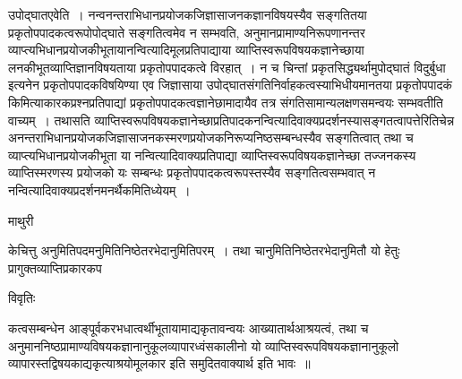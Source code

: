 \documentclass[10pt, openany]{book}
\begin{document}
{{\la उपोद्घातएवेति~।} नन्वनन्तराभिधानप्रयोजकजिज्ञासाजनकज्ञानविषयस्यैव सङ्गतितया प्रकृतोपपादकत्वरूपोपोद्घाते सङ्गतित्वमेव न सम्भवति,
अनुमानप्रामाण्यनिरूपणानन्तर व्याप्त्यभिधानप्रयोजकीभूतायानन्वित्यादिमूलप्रतिपाद्याया व्याप्तिस्वरूपविषयकज्ञानेच्छाया लनकीभूतव्याप्तिज्ञानविषयताया प्रकृतोपपादकत्वे विरहात्~। न च चिन्तां प्रकृतसिद्ध्यर्थामुपोद्घातं विदुर्बुधा इत्यनेन प्रकृतोपपादकविषयिण्या एव जिज्ञासाया उपोद्घातसंगतिनिर्वाहकत्वस्याभिधीयमानतया प्रकृतोपपादकं किमित्याकारकप्रश्नप्रतिपाद्यां प्रकृतोपपादकत्वज्ञानेछामादायैव तत्र संगतिसामान्यलक्षणसमन्वयः सम्भवतीति वाच्यम्~। तथासति व्याप्तिस्वरूपविषयकज्ञानेच्छाप्रतिपादकनन्वित्यादिवाक्यप्रदर्शनस्यासङ्गतत्वापत्तेरितिचेन्न अनन्तराभिधानप्रयोजकजिज्ञासाजनकस्मरणप्रयोजकनिरूप्यनिष्ठसम्बन्धस्यैव सङ्गतित्वात् तथा च व्याप्त्यभिधानप्रयोजकीभूता या नन्वित्यादिवाक्यप्रतिपाद्या व्याप्तिस्वरूपविषयकज्ञानेच्छा तज्जनकस्य व्याप्तिस्मरणस्य प्रयोजको यः सम्बन्धः
प्रकृतोपपादकत्वरूपस्तस्यैव सङ्गतित्वसम्भवात् न नन्वित्यादिवाक्यप्रदर्शनमनर्थैकमितिध्येयम्~।
\newpage
\fancyhead[RO,LE]{\thepage}
\begin{center}  माथुरी  \end{center}
{\la 
केचित्तु अनुमितिपदमनुमितिनिष्ठेतरभेदानुमितिपरम्~। तथा चानुमितिनिष्ठेतरभेदानुमितौ यो हेतुः प्रागुक्तव्याप्तिप्रकारकप}
\begin{center}     विवृतिः \end{center}

कत्वसम्बन्धेन आङ्पूर्वकरभधात्वर्थीभूतायामाद्यकृतावन्वयः आख्यातार्थआश्रयत्वं, तथा च अनुमाननिष्ठप्रामाण्यविषयकज्ञानानुकूलव्यापारध्वंसकालीनो यो व्याप्तिस्वरूपविषयकज्ञानानुकूलो व्यापारस्तद्विषयकाद्यकृत्याश्रयोमूलकार इति समुदितवाक्यार्थ इति भावः~॥\\

}
\end{document}
